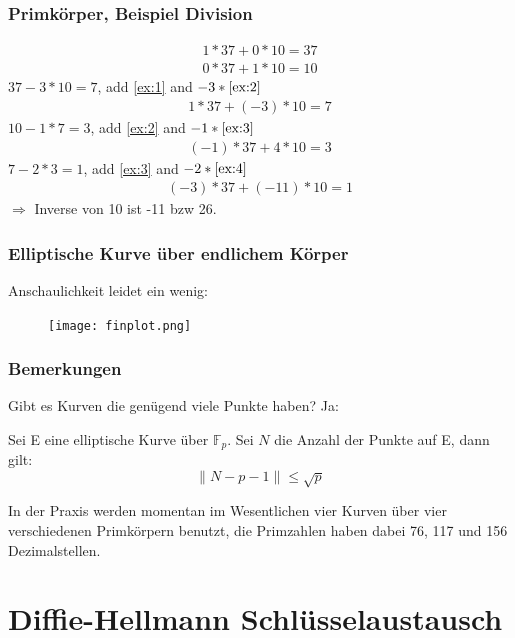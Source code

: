 \documentclass{beamer}
\newcommand{\F}{\mathbb{F}}
\begin{document}
\begin{frame}
  \frametitle{Primkörper, Beispiel Division}
  \vspace*{-1cm}
  \begin{eqnarray}
    1 * 37 + 0 * 10 = 37  \label{ex:1} \\
    0 * 37 + 1 * 10 = 10  \label{ex:2}
  \end{eqnarray}
  $37 - 3 * 10 = 7$, add \eqref{ex:1} and $-3 * \eqref{ex:2}$
  \begin{eqnarray}
    1 *37 + (-3) * 10 = 7 \label{ex:3}
  \end{eqnarray}
  $10 - 1 * 7 = 3$, add \eqref{ex:2} and $-1 * \eqref{ex:3}$
  \begin{eqnarray}
    (-1) * 37 + 4 * 10 = 3 \label{ex:4}
  \end{eqnarray}
  $7 - 2*3 = 1$, add \eqref{ex:3} and $-2 * \eqref{ex:4}$
  \begin{eqnarray}
    (-3) * 37 + (-11) * 10 = 1
  \end{eqnarray}
  $\Rightarrow$ Inverse von 10 ist -11 bzw 26.
\end{frame}

\begin{frame}
  \frametitle{Elliptische Kurve über endlichem Körper}
  Anschaulichkeit leidet ein wenig:
  \begin{figure}
    \texttt{[image: finplot.png]}
  \end{figure}
\end{frame}
\begin{frame}
  \frametitle{Bemerkungen}
  Gibt es Kurven die genügend viele Punkte haben? Ja:
  \begin{theorem}
    Sei E eine elliptische Kurve über $\F_p$. Sei $N$ die Anzahl der Punkte
    auf E, dann gilt:
    \begin{equation}
      \| N - p - 1 \| \le \sqrt{p}
    \end{equation}
  \end{theorem}
  In der Praxis werden momentan im Wesentlichen vier Kurven über vier
  verschiedenen Primkörpern benutzt, die Primzahlen haben dabei 76, 117 und
  156 Dezimalstellen.
\end{frame}


\section{Diffie-Hellmann Schlüsselaustausch}
\end{document}
